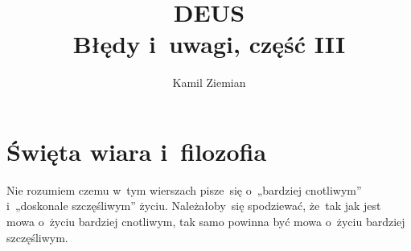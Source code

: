 \documentclass[a4paper,11pt]{article}
\title{DEUS \\
  {\Large Błędy i~uwagi, część III}}
\author{Kamil Ziemian}
\begin{document}





\maketitle  %





\section{Święta wiara i~filozofia}

\vspace{\spaceTwo}







{}

\vspace{0em}



\vspace{0em}


\noindent
{} Nie rozumiem czemu w~tym wierszach pisze~się o~„bardziej
cnotliwym” i~„doskonale szczęśliwym” życiu. Należałoby~się spodziewać,
że~tak jak jest mowa o~życiu bardziej cnotliwym, tak samo powinna być mowa
o~życiu bardziej szczęśliwym.

\vspace{\spaceFour}
\end{document}
